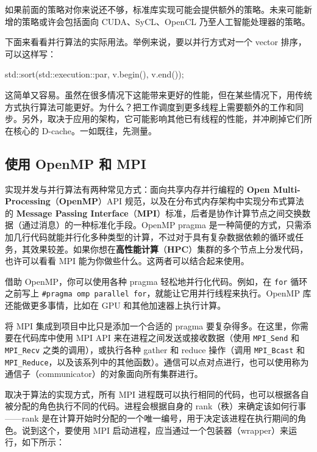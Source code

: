 如果前面的策略对你来说还不够，标准库实现可能会提供额外的策略。未来可能新增的策略或许会包括面向 CUDA、SyCL、OpenCL 乃至人工智能处理器的策略。

下面来看看并行算法的实际用法。举例来说，要以并行方式对一个 vector 排序，可以这样写：

\begin{codebox}[cpp]
std::sort(std::execution::par, v.begin(), v.end());
\end{codebox}

\label{idx:1241}
\label{idx:1242}
这简单又容易。虽然在很多情况下这能带来更好的性能，但在某些情况下，用传统方式执行算法可能更好。为什么？把工作调度到更多线程上需要额外的工作和同步。另外，取决于应用的架构，它可能影响其他已有线程的性能，并冲刷掉它们所在核心的 D-cache。一如既往，先测量。

\subsection{使用 OpenMP 和 MPI}

\label{idx:1243}
\label{idx:1244}
\label{idx:1245}
\label{idx:1246}
\label{idx:1247}
实现并发与并行算法有两种常见方式：面向共享内存并行编程的 \textbf{Open Multi-Processing}（\textbf{OpenMP}）API 规范，以及在分布式内存架构中实现分布式算法的 \textbf{Message Passing Interface}（\textbf{MPI}）标准，后者是协作计算节点之间交换数据（通过消息）的一种标准化手段。OpenMP pragma 是一种简便的方式，只需添加几行代码就能并行化多种类型的计算，不过对于具有复杂数据依赖的循环或任务，其效果较差。如果你想在\textbf{高性能计算}（\textbf{HPC}）集群的多个节点上分发代码，也许可以看看 MPI 能为你做些什么。这两者可以结合起来使用。

借助 OpenMP，你可以使用各种 pragma 轻松地并行化代码。例如，在 \texttt{for} 循环之前写上 \texttt{\#pragma omp parallel for}，就能让它用并行线程来执行。OpenMP 库还能做更多事情，比如在 GPU 和其他加速器上执行计算。

将 MPI 集成到项目中比只是添加一个合适的 pragma 要复杂得多。在这里，你需要在代码库中使用 MPI API 来在进程之间发送或接收数据（使用 \texttt{MPI\_Send} 和 \texttt{MPI\_Recv} 之类的调用），或执行各种 gather 和 reduce 操作（调用 \texttt{MPI\_\allowbreak{}Bcast} 和 \texttt{MPI\_\allowbreak{}Reduce}，以及该系列中的其他函数）。通信可以点对点进行，也可以使用称为通信子（communicator）的对象面向所有集群进行。

取决于算法的实现方式，所有 MPI 进程既可以执行相同的代码，也可以根据各自被分配的角色执行不同的代码。进程会根据自身的 rank（秩）来确定该如何行事——rank 是在计算开始时分配的一个唯一编号，用于决定该进程在执行期间的角色。说到这个，要使用 MPI 启动进程，应当通过一个包装器（wrapper）来运行，如下所示：

